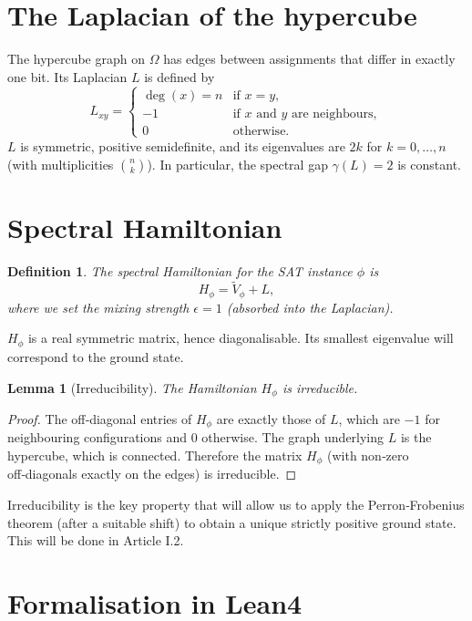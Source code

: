 \documentclass[11pt,a4paper]{article}
\newtheorem{lemma}[theorem]{Lemma}
\newtheorem{definition}[theorem]{Definition}
\begin{document}
\section{The Laplacian of the hypercube}

The hypercube graph on $\Omega$ has edges between assignments that differ in exactly one bit. Its Laplacian $L$ is defined by
\[
L_{xy} = \begin{cases}
\deg(x) = n & \text{if } x=y,\\
-1 & \text{if } x \text{ and } y \text{ are neighbours},\\
0 & \text{otherwise}.
\end{cases}
\]
$L$ is symmetric, positive semidefinite, and its eigenvalues are $2k$ for $k=0,\dots,n$ (with multiplicities $\binom{n}{k}$). In particular, the spectral gap $\gamma(L) = 2$ is constant.

\section{Spectral Hamiltonian}

\begin{definition}
The spectral Hamiltonian for the SAT instance $\phi$ is
\[
H_\phi = \tilde{V}_\phi + L,
\]
where we set the mixing strength $\epsilon = 1$ (absorbed into the Laplacian).
\end{definition}

$H_\phi$ is a real symmetric matrix, hence diagonalisable. Its smallest eigenvalue will correspond to the ground state.

\begin{lemma}[Irreducibility]
The Hamiltonian $H_\phi$ is irreducible.
\end{lemma}
\begin{proof}
The off‑diagonal entries of $H_\phi$ are exactly those of $L$, which are $-1$ for neighbouring configurations and $0$ otherwise. The graph underlying $L$ is the hypercube, which is connected. Therefore the matrix $H_\phi$ (with non‑zero off‑diagonals exactly on the edges) is irreducible.
\end{proof}

Irreducibility is the key property that will allow us to apply the Perron‑Frobenius theorem (after a suitable shift) to obtain a unique strictly positive ground state. This will be done in Article I.2.

\section{Formalisation in Lean4}
\end{document}
